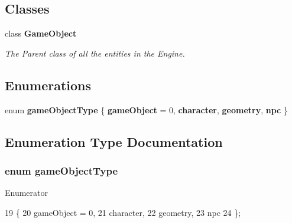 \subsection*{Classes}
\begin{DoxyCompactItemize}
\item 
class {\bf Game\+Object}
\begin{DoxyCompactList}\small\item\em The Parent class of all the entities in the Engine. \end{DoxyCompactList}\end{DoxyCompactItemize}
\subsection*{Enumerations}
\begin{DoxyCompactItemize}
\item 
enum {\bf game\+Object\+Type} \{ {\bf game\+Object} = 0, 
{\bf character}, 
{\bf geometry}, 
{\bf npc}
 \}
\end{DoxyCompactItemize}


\subsection{Enumeration Type Documentation}
\subsubsection[{game\+Object\+Type}]{\setlength{\rightskip}{0pt plus 5cm}enum {\bf game\+Object\+Type}}\label{_game_object_8h_a25430a4bd8f9fd089ed157eebe33bd1f}
\begin{Desc}
\item[Enumerator]\par
\begin{description}
\item[{\em 
game\+Object\label{_game_object_8h_a25430a4bd8f9fd089ed157eebe33bd1fa4354a43d527303214cd0908744288d43}
}]\item[{\em 
character\label{_game_object_8h_a25430a4bd8f9fd089ed157eebe33bd1fafa40ef3af4fea0001b535318130960b2}
}]\item[{\em 
geometry\label{_game_object_8h_a25430a4bd8f9fd089ed157eebe33bd1faca9fbb8566c4ed1c0d95df58034addaf}
}]\item[{\em 
npc\label{_game_object_8h_a25430a4bd8f9fd089ed157eebe33bd1fa2ff2e92a29da89efc1a2eb8140ca09a9}
}]\end{description}
\end{Desc}

\begin{DoxyCode}
19 \{
20     gameObject = 0,
21     character,
22     geometry,
23     npc
24 \};
\end{DoxyCode}
